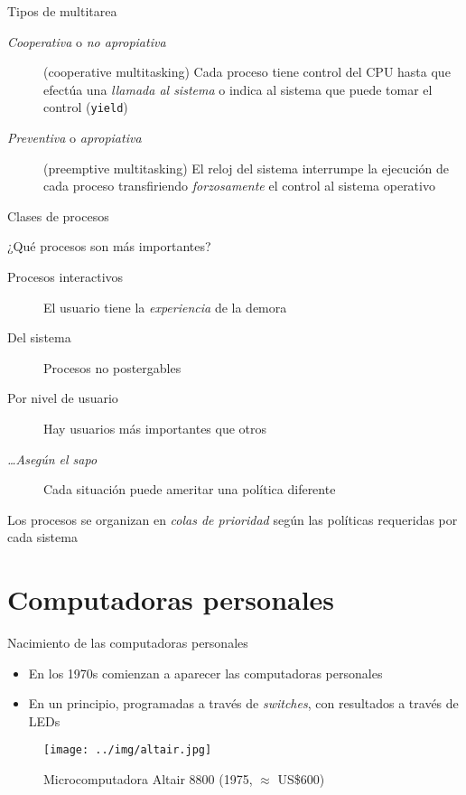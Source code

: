 \documentclass[presentation]{beamer}
\begin{document}
\begin{frame}[label={sec:orge2d4131},fragile]{Tipos de multitarea}
 \begin{description}
\item[{\emph{Cooperativa} o \emph{no apropiativa}}] (cooperative multitasking) Cada
proceso tiene control del CPU hasta que efectúa una \emph{llamada al
sistema} o indica al sistema que puede tomar el control (\texttt{yield})

\item[{\emph{Preventiva} o \emph{apropiativa}}] (preemptive multitasking) El reloj
del sistema interrumpe la ejecución de cada proceso transfiriendo
\emph{forzosamente} el control al sistema operativo
\end{description}
\end{frame}

\begin{frame}[label={sec:org5a0aaa7}]{Clases de procesos}
\begin{center}
¿Qué procesos son más importantes?
\end{center}
\begin{description}
\item[{Procesos interactivos}] El usuario tiene la \emph{experiencia} de la demora
\item[{Del sistema}] Procesos no postergables
\item[{Por nivel de usuario}] Hay usuarios más importantes que otros
\item[{\emph{…Asegún el sapo}}] Cada situación puede ameritar una política
diferente
\end{description}
\begin{center}
Los procesos se organizan en \emph{colas de prioridad} según las políticas
requeridas por cada sistema
\end{center}
\end{frame}

\section{Computadoras personales}
\label{sec:orgf23cc6d}
\begin{frame}[label={sec:org36d6798}]{Nacimiento de las computadoras personales}
\begin{itemize}
\item En los 1970s comienzan a aparecer las computadoras personales
\item En un principio, programadas a través de \emph{switches}, con resultados
a través de LEDs
\end{itemize}
\begin{figure}[htbp]
\centering
\texttt{[image: ../img/altair.jpg]}
\caption{Microcomputadora Altair 8800 (1975, \(\approx\) US\$600)}
\end{figure}
\end{frame}
\end{document}
